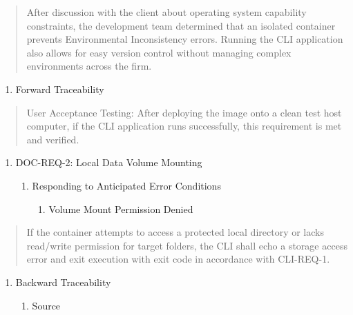 \begin{quote}
After discussion with the client about operating system capability
constraints, the development team determined that an isolated container
prevents Environmental Inconsistency errors. Running the CLI application
also allows for easy version control without managing complex
environments across the firm.
\end{quote}

\begin{enumerate}
\def\labelenumi{\alph{enumi}.}
\item
  Forward Traceability
\end{enumerate}

\begin{quote}
User Acceptance Testing: After deploying the image onto a clean test
host computer, if the CLI application runs successfully, this
requirement is met and verified.
\end{quote}

\begin{enumerate}
\def\labelenumi{\Roman{enumi})}
\setcounter{enumi}{1}
\item
  DOC-REQ-2: Local Data Volume Mounting

  \begin{enumerate}
  \def\labelenumii{\alph{enumii}.}
  \item
    Responding to Anticipated Error Conditions

    \begin{enumerate}
    \def\labelenumiii{\roman{enumiii}.}
    \item
      Volume Mount Permission Denied
    \end{enumerate}
  \end{enumerate}
\end{enumerate}

\begin{quote}
If the container attempts to access a protected local directory or lacks
read/write permission for target folders, the CLI shall echo a storage
access error and exit execution with exit code in accordance with
CLI-REQ-1.
\end{quote}

\begin{enumerate}
\def\labelenumi{\alph{enumi}.}
\setcounter{enumi}{1}
\item
  Backward Traceability

  \begin{enumerate}
  \def\labelenumii{\roman{enumii}.}
  \item
    Source
  \end{enumerate}
\end{enumerate}


